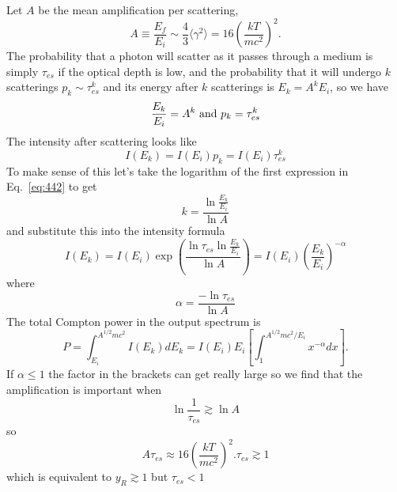 Let $A$ be the mean amplification per scattering,
\begin{equation}
A \equiv \frac{E_f}{E_i} \sim \frac{4}{3} \langle \gamma^2 \rangle =
16 \left ( \frac{kT}{mc^2} \right )^2.
\label{eq:441}
\end{equation}
The probability that a photon will scatter as it passes through a
medium is simply $\tau_{es}$ if the optical depth is low, and the
probability that it will undergo $k$ scatterings $p_k \sim
\tau_{es}^k$ and its energy after $k$ scatterings is $E_k=A^k E_i$, so we have
\begin{equation}
\frac{E_k}{E_i} = A^k~\hbox{\rm and}~p_k=\tau_{es}^k
\label{eq:442}
\end{equation}
The intensity after scattering looks like
\begin{equation}
I(E_k) = I(E_i) p_k = I(E_i) \tau_{es}^k
\label{eq:443}
\end{equation}
To make sense of this let's take the logarithm of the first expression
in Eq.~\ref{eq:442} to get
\begin{equation}
k = \frac{\ln\frac{E_k}{E_i}}{\ln A}
\label{eq:444}
\end{equation}
and substitute this into the intensity formula
\begin{equation}
I(E_k) = I(E_i) \exp \left ( \frac{\ln\tau_{es} 
\ln\frac{E_k}{E_i}}{\ln A} \right ) = I(E_i) \left ( \frac{E_k}{E_i}
\right )^{-\alpha}
\label{eq:445}
\end{equation}
where
\begin{equation}
\alpha = \frac{-\ln \tau_{es}}{\ln A}
\label{eq:446}
\end{equation}
The total Compton power in the output spectrum is
\begin{equation}
P = \int_{E_i}^{A^{1/2}mc^2} I(E_k) dE_k = I(E_i) E_i \left [
  \int_1^{A^{1/2} mc^2/E_i} x^{-\alpha} dx \right ].
\label{eq:447}
\end{equation}
If $\alpha \leq 1$ the factor in the brackets can get really large so
we find that the amplification is important when 
\begin{equation}
\ln \frac{1}{\tau_{es}} \gtrsim \ln A
\label{eq:448}
\end{equation}
so
\begin{equation}
A \tau_{es} \approx 16 \left ( \frac{kT}{mc^2} \right )^2.
\tau_{es} \gtrsim 1
\label{eq:449}
\end{equation}
which is equivalent to $y_R \gtrsim 1$ but $\tau_{es} < 1$


